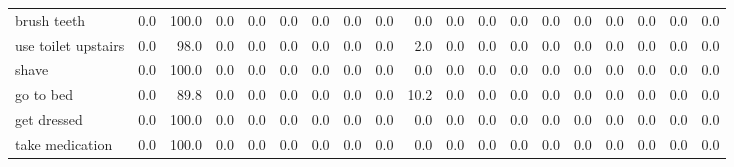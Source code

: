 \documentclass{article}
\begin{document}
\begin{sideways}
\begin{tabular}{lrrrrrrrrrrrrrrrrrr}
brush teeth                   &         0.0 &              100.0 &           0.0 &                          0.0 &                0.0 &                0.0 &                        0.0 &          0.0 &              0.0 &                0.0 &                    0.0 &                      0.0 &                  0.0 &                   0.0 &              0.0 &              0.0 &                                  0.0 &          0.0 \\
use toilet upstairs           &         0.0 &               98.0 &           0.0 &                          0.0 &                0.0 &                0.0 &                        0.0 &          0.0 &              2.0 &                0.0 &                    0.0 &                      0.0 &                  0.0 &                   0.0 &              0.0 &              0.0 &                                  0.0 &          0.0 \\
shave                         &         0.0 &              100.0 &           0.0 &                          0.0 &                0.0 &                0.0 &                        0.0 &          0.0 &              0.0 &                0.0 &                    0.0 &                      0.0 &                  0.0 &                   0.0 &              0.0 &              0.0 &                                  0.0 &          0.0 \\
go to bed                     &         0.0 &               89.8 &           0.0 &                          0.0 &                0.0 &                0.0 &                        0.0 &          0.0 &             10.2 &                0.0 &                    0.0 &                      0.0 &                  0.0 &                   0.0 &              0.0 &              0.0 &                                  0.0 &          0.0 \\
get dressed                   &         0.0 &              100.0 &           0.0 &                          0.0 &                0.0 &                0.0 &                        0.0 &          0.0 &              0.0 &                0.0 &                    0.0 &                      0.0 &                  0.0 &                   0.0 &              0.0 &              0.0 &                                  0.0 &          0.0 \\
take medication               &         0.0 &              100.0 &           0.0 &                          0.0 &                0.0 &                0.0 &                        0.0 &          0.0 &              0.0 &                0.0 &                    0.0 &                      0.0 &                  0.0 &                   0.0 &              0.0 &              0.0 &                                  0.0 &          0.0 \\

\end{tabular}
\end{sideways}
\end{document}
